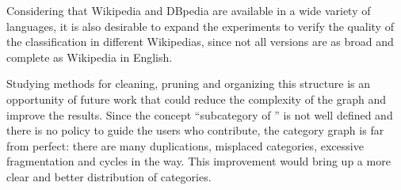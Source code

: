 Considering that Wikipedia and DBpedia are available in a wide variety of languages, it is also desirable to expand the experiments to verify the quality of the classification in different Wikipedias, since not all versions are as broad and complete as Wikipedia in English.

Studying methods for cleaning, pruning and organizing this structure is an opportunity of future work that could reduce the complexity of the graph and improve the results. 
Since the concept ``subcategory of ” is not well defined and there is no policy to guide the users who contribute, the category graph is far from perfect: there are many duplications, misplaced categories, excessive fragmentation and cycles in the way. This improvement would bring up a more clear and better distribution of categories.







